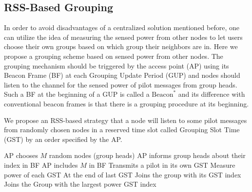 \subsection{RSS-Based Grouping}
\label{rssbasedmain}
In order to avoid disadvantages of a centralized solution mentioned before, one can utilize the idea of measuring the sensed power from other nodes to let users choose their own groups based on which group their neighbors are in. Here we propose a grouping scheme based on sensed power from other nodes. %
The grouping mechanism should be triggered by the access point (AP) using its Beacon Frame (BF) at each Grouping Update Period (GUP) and nodes should listen to the channel for the sensed power of pilot messages from group heads. Such a BF at the beginning of a GUP is called a $\text{Beacon}^\ast$ and its difference with conventional beacon frames is that there is a grouping procedure at its beginning. 




We propose an RSS-based strategy that a node will listen to some pilot messages from randomly chosen nodes in a reserved time slot called Grouping Slot Time (GST) by an order specified by the AP.

\begin{algorithmic}
\STATE AP chooses $M$ random nodes (group heads)
\STATE AP informs group heads about their index in BF
\STATE AP includes $M$ in BF
\STATE Transmits a pilot in its own GST
\ELSE
\STATE Measure power of each GST
\ENDIF
\ENDFOR
\STATE At the end of last GST
\STATE Joins the group with its GST index
\ELSE
\STATE Joins the Group with the largest power GST index
\ENDIF
\ENDFOR
\ENDFOR
\end{algorithmic}

